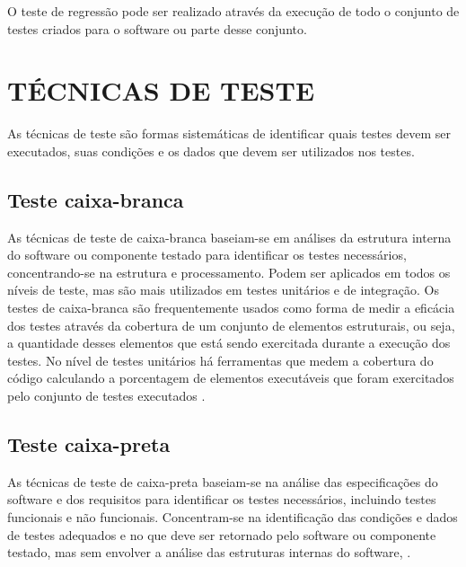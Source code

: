        O teste de regressão pode ser realizado através da execução de todo o conjunto de testes criados para o software ou parte desse conjunto.

    \section{TÉCNICAS DE TESTE}
    
    As técnicas de teste são formas sistemáticas de identificar quais testes devem ser executados, suas condições e os dados que devem ser utilizados nos testes.
    
        \subsection{Teste caixa-branca}
        
        As técnicas de teste de caixa-branca baseiam-se em análises da estrutura interna do software ou componente testado para identificar os testes necessários, concentrando-se na estrutura e processamento. Podem ser aplicados em todos os níveis de teste, mas são mais utilizados em testes unitários e de integração. Os testes de caixa-branca são frequentemente usados como forma de medir a eficácia dos testes através da cobertura de um conjunto de elementos estruturais, ou seja, a quantidade desses elementos que está sendo exercitada durante a execução dos testes. No nível de testes unitários há ferramentas que medem a cobertura do código calculando a porcentagem de elementos executáveis que foram exercitados pelo conjunto de testes executados \cite{ISQTB2019}.
    
        \subsection{Teste caixa-preta}
        
        As técnicas de teste de caixa-preta baseiam-se na análise das especificações do software e dos requisitos para identificar os testes necessários, incluindo testes funcionais e não funcionais. Concentram-se na identificação das condições e dados de testes adequados e no que deve ser retornado pelo software ou componente testado, mas sem envolver a análise das estruturas internas do software, \cite{ISQTB2019}.
    